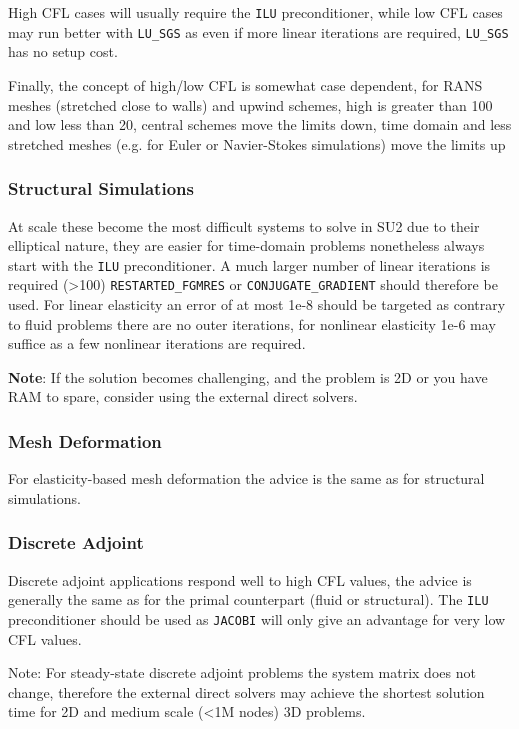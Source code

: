 \documentclass[12pt, a4paper, twoside]{article}
\begin{document}
High CFL cases will usually require the \verb|ILU| preconditioner, while low CFL cases may run better with \verb|LU_SGS| as even if more linear iterations are required, \verb|LU_SGS| has no setup cost.

Finally, the concept of high/low CFL is somewhat case dependent, for RANS meshes (stretched close to walls) and upwind schemes, high is greater than 100 and low less than 20, central schemes move the limits down, time domain and less stretched meshes (e.g. for Euler or Navier-Stokes simulations) move the limits up

\subsubsection{Structural Simulations}
At scale these become the most difficult systems to solve in SU2 due to their elliptical nature, they are easier for time-domain problems nonetheless always start with the \verb|ILU| preconditioner. A much larger number of linear iterations is required (>100) \verb|RESTARTED_FGMRES| or \verb|CONJUGATE_GRADIENT| should therefore be used. For linear elasticity an error of at most 1e-8 should be targeted as contrary to fluid problems there are no outer iterations, for nonlinear elasticity 1e-6 may suffice as a few nonlinear iterations are required.

\textbf{Note}: If the solution becomes challenging, and the problem is 2D or you have RAM to spare, consider using the external direct solvers.

\subsubsection{Mesh Deformation}
For elasticity-based mesh deformation the advice is the same as for structural simulations.

\subsubsection{Discrete Adjoint}
Discrete adjoint applications respond well to high CFL values, the advice is generally the same as for the primal counterpart (fluid or structural). The \verb|ILU| preconditioner should be used as \verb|JACOBI| will only give an advantage for very low CFL values.

Note: For steady-state discrete adjoint problems the system matrix does not change, therefore the external direct solvers may achieve the shortest solution time for 2D and medium scale (<1M nodes) 3D problems.
\end{document}
